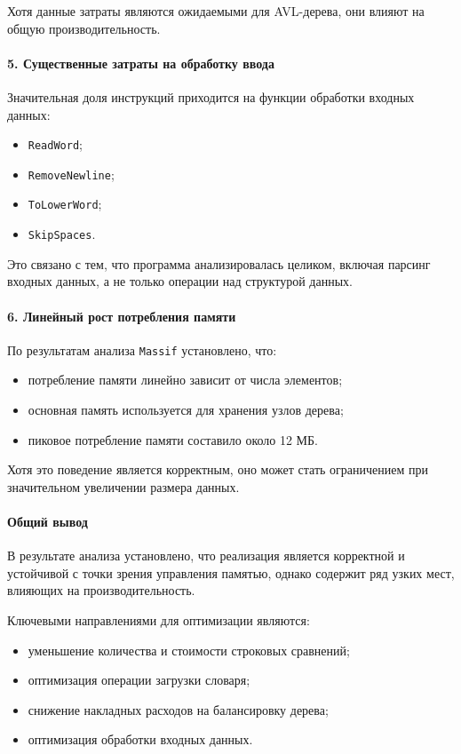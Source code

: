 \documentclass[12pt]{article}
\begin{document}
 Хотя данные затраты являются ожидаемыми для AVL-дерева, они влияют на общую производительность.
 
 \paragraph{5. Существенные затраты на обработку ввода}
 
 Значительная доля инструкций приходится на функции обработки входных данных:
 \begin{itemize}
 	\item \texttt{ReadWord};
 	\item \texttt{RemoveNewline};
 	\item \texttt{ToLowerWord};
 	\item \texttt{SkipSpaces}.
 \end{itemize}
 
 Это связано с тем, что программа анализировалась целиком, включая парсинг входных данных, а не только операции над структурой данных.
 
 \paragraph{6. Линейный рост потребления памяти}
 
 По результатам анализа \texttt{Massif} установлено, что:
 \begin{itemize}
 	\item потребление памяти линейно зависит от числа элементов;
 	\item основная память используется для хранения узлов дерева;
 	\item пиковое потребление памяти составило около 12 МБ.
 \end{itemize}
 
 Хотя это поведение является корректным, оно может стать ограничением при значительном увеличении размера данных.
 
 \paragraph{Общий вывод}
 
 В результате анализа установлено, что реализация является корректной и устойчивой с точки зрения управления памятью, однако содержит ряд узких мест, влияющих на производительность.
 
 Ключевыми направлениями для оптимизации являются:
 \begin{itemize}
 	\item уменьшение количества и стоимости строковых сравнений;
 	\item оптимизация операции загрузки словаря;
 	\item снижение накладных расходов на балансировку дерева;
 	\item оптимизация обработки входных данных.
 \end{itemize}
\end{document}
